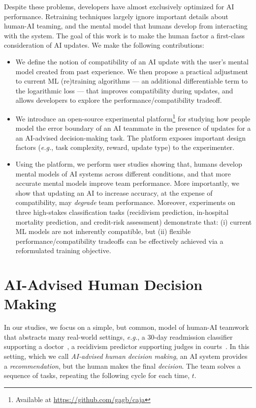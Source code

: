 \documentclass[letterpaper]{article} %
\newcommand{\eg}{\mbox{\it e.g.}}
\newcommand{\?}{\mbox{?}}
\newcommand{\name}{AI-advised human decision making}
\begin{document}
Despite these problems, developers have almost exclusively optimized for AI performance.  Retraining techniques largely ignore important details about human-AI teaming, and the mental model that humans develop from interacting with the system. %
The goal of this work is to make the human factor a first-class consideration of AI updates. We make the following contributions: 

\begin{itemize}
\item We define the notion of compatibility of an AI update with the user's mental model created from past experience.
We then propose a practical adjustment to current ML (re)training algorithms --- an additional differentiable term to the logarithmic loss --- that improves compatibility during updates, 
and allows developers to explore the performance/compatibility tradeoff.

\item We introduce an open-source experimental platform\footnote{Available at \url{https://github.com/gagb/caja}} for 
studying how people model the error boundary of an AI teammate in the presence of updates for a an AI-advised decision-making task. %
The platform exposes important design factors (\eg, task complexity, reward, update type) to the experimenter. 

\item Using the platform, we perform user studies showing that, humans develop mental models of AI systems across different conditions, and that more accurate mental models improve team performance. More importantly, we show that updating an AI to increase accuracy, at the expense of compatibility, may {\em degrade} team performance. 
 Moreover, experiments on three high-stakes classification tasks (recidivism prediction, in-hospital mortality prediction, and credit-risk assessment) demonstrate that: (i) current ML models are not inherently compatible, but (ii) flexible performance/compatibility tradeoffs can be effectively achieved via a reformulated training objective.


\end{itemize}


\section{AI-Advised Human Decision Making}

In our studies, we focus on a simple, but common, model of human-AI teamwork that abstracts many real-world settings,
\eg, a 30-day readmission classifier supporting a doctor~\cite{bayati2014data}, a recidivism predictor supporting judges in courts~\cite{angwin2016machine}. In this setting, which we call {\em \name}, an AI 
system provides a {\em recommendation}, but the human makes the final {\em decision}.
The team solves a sequence of tasks, repeating the following cycle for each time, $t$.
\end{document}
